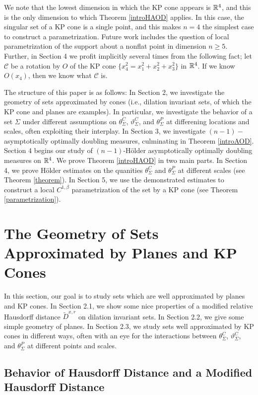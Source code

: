 \documentclass[11pt]{article}
\theoremstyle{definition}
\numberwithin{equation}{section}
\newcommand{\cC}{\mathcal{C}}
\newcommand{\sgeq}{\geqslant}
\newcommand{\twid}[1]{\widetilde{#1}}
\begin{document}
We note that the lowest dimension in which the KP cone appears is $\mathbb{R}^4$, and this is the only dimension to which Theorem \ref{introHAOD} applies. In this case, the singular set of a KP cone is a single point, and this makes $n=4$ the simplest case to construct a parametrization. Future work includes the question of local parametrization of the support about a nonflat point in dimension $n\sgeq 5$. Further, in Section 4 we profit implicitly several times from the following fact; let $\cC$ be a rotation by $O$ of the KP cone $\{x_4^2 = x_1^2 + x_2^2 + x_3^2\}$ in $\mathbb{R}^4$. If we know $O(x_4)$, then we know what $\cC$ is. 


The structure of this paper is as follows: In Section 2, we investigate the geometry of sets approximated by cones (i.e., dilation invariant sets, of which the KP cone and planes are examples). In particular, we investigate the behavior of a set $\Sigma$ under different assumptions on $\theta_\Sigma^C$, $\vartheta_\Sigma^C$, and $\theta_\Sigma^P$ at differening locations and scales, often exploiting their interplay. In Section 3, we investigate $(n-1)-$asymptotically optimally doubling measures, culminating in Theorem \ref{introAOD}. Section 4 begins our study of $(n-1)$-H\"older asymptotically optimally doubling measures on $\mathbb{R}^4$. We prove Theorem \ref{introHAOD} in two main parts. In Section 4, we prove H\"older estimates on the quanities $\theta_\Sigma^C$ and $\theta_\Sigma^P$ at different scales (see Theorem \ref{theorem}). In Section 5, we use the demonstrated estimates to construct a local $C^{1,\beta}$ parametrization of the set by a KP cone (see Theorem \ref{parametrization}).


\section{The Geometry of Sets Approximated by Planes and KP Cones}

In this section, our goal is to study sets which are well approximated by planes and KP cones. In Section 2.1, we show some nice properties of a modified relative Hausdorff distance $\twid D^{x,r}$ on dilation invariant sets. In Section 2.2, we give some simple geometry of planes. In Section 2.3, we study sets well approximated by KP cones in different ways, often with an eye for the interactions between $\theta_\Sigma^C$, $\vartheta_\Sigma^C$, and $\theta_\Sigma^P$ at different points and scales.

\subsection{Behavior of Hausdorff Distance and a Modified Hausdorff Distance}
\end{document}
